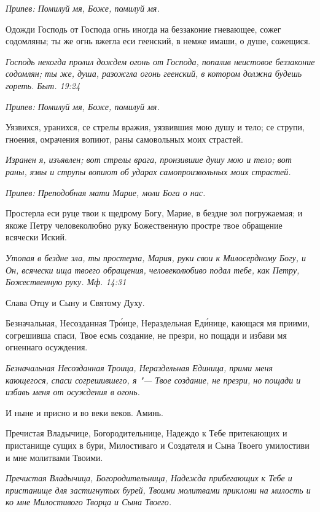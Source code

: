 \itshape Припев:\normalfont{} Помилуй мя, Боже, помилуй мя.


Одожди Господь от Господа огнь иногда на беззаконие гневающее, сожег содомляны; ты же огнь вжегла еси геенский, в немже имаши, о душе, сожещися.


\itshape Господь некогда пролил дождем огонь от Господа, попалив неистовое беззаконие содомлян; ты же, душа, разожгла огонь геенский, в котором должна будешь гореть. Быт. 19:24\normalfont{}


\itshape Припев:\normalfont{} Помилуй мя, Боже, помилуй мя.


Уязвихся, уранихся, се стрелы вражия, уязвившия мою душу и тело; се струпи, гноения, омрачения вопиют, раны самовольных моих страстей.


\itshape Изранен я, изъявлен; вот стрелы врага, пронзившие душу мою и тело; вот раны, язвы и струпы вопиют об ударах самопроизвольных моих страстей.\normalfont{}


\itshape Припев:\normalfont{} Преподобная мати Марие, моли Бога о нас.


Простерла еси руце твои к щедрому Богу, Марие, в бездне зол погружаемая; и якоже Петру человеколюбно руку Божественную простре твое обращение всячески Иский.


\itshape Утопая в бездне зла, ты простерла, Мария, руки свои к Милосердному Богу, и Он, всячески ища твоего обращения, человеколюбиво подал тебе, как Петру, Божественную руку. Мф. 14:31\normalfont{}


Слава Отцу и Сыну и Святому Духу.


Безначальная, Несозданная Тро́ице, Нераздельная Еди́нице, кающася мя приими, согрешивша спаси, Твое есмь создание, не презри, но пощади и избави мя огненнаго осуждения.


\itshape Безначальная Несозданная Троица, Нераздельная Единица, прими меня кающегося, спаси согрешившего, я "--- Твое создание, не презри, но пощади и избавь меня от осуждения в огонь.\normalfont{}


И ныне и присно и во веки веков. Аминь.


Пречистая Владычице, Богородительнице, Надеждо к Тебе притекающих и пристанище сущих в бури, Милостиваго и Создателя и Сына Твоего умилостиви и мне молитвами Твоими.


\itshape Пречистая Владычица, Богородительница, Надежда прибегающих к Тебе и пристанище для застигнутых бурей, Твоими молитвами приклони на милость и ко мне Милостивого Творца и Сына Твоего.\normalfont{}





